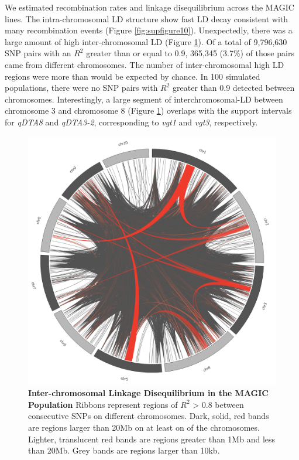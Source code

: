 \documentclass[article,9pt,twocolumn,twoside]{rilabRxiv}
\begin{document}
We estimated recombination rates and linkage disequilibrium across the MAGIC lines.
The intra-chromosomal LD structure show fast LD decay consistent with many recombination events (Figure \ref{fig:supfigure10}).
Unexpectedly, there was a large amount of high inter-chromosomal LD (Figure \ref{fig:circosfigure}).
Of a total of 9,796,630 SNP pairs with an $R^2$ greater than or equal to 0.9, 365,345 (3.7\%) of those pairs came from different chromosomes.
The number of inter-chromosomal high LD regions were more than would be expected by chance. In 100 simulated populations, there were no SNP pairs with $R^2$ greater than 0.9 detected between chromosomes.
Interestingly, a large segment of interchromosomal-LD between chromosome 3 and chromosome 8 (Figure \ref{fig:circosfigure}) overlaps with the support intervals for \emph{qDTA8} and \emph{qDTA3-2}, corresponding to \emph{vgt1} and \emph{vgt3}, respectively.

\begin{figure}[ht]
\centering
\includegraphics[width=\linewidth]{figures/circos.png}
\caption{\textbf{Inter-chromosomal Linkage Disequilibrium in the MAGIC Population} Ribbons represent regions of $R^2$ > 0.8 between consecutive SNPs on different chromosomes. Dark, solid, red bands are regions larger than 20Mb on at least on of the chromosomes. Lighter, translucent red bands are regions greater than 1Mb and less than 20Mb. Grey bands are regions larger than 10kb.}
\label{fig:circosfigure}
\end{figure}
\end{document}
